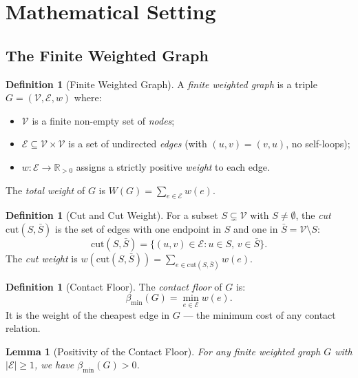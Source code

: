 \documentclass[11pt,twocolumn,a4paper]{article}
\theoremstyle{plain}
\newtheorem{lemma}[theorem]{Lemma}
\theoremstyle{definition}
\newtheorem{definition}[theorem]{Definition}
\theoremstyle{remark}
\newcommand{\cut}{\mathrm{cut}}
\newcommand{\reals}{\mathbb{R}}
\newcommand{\Ecal}{\mathcal{E}}
\newcommand{\Vcal}{\mathcal{V}}
\newcommand{\bmin}{\beta_{\min}}
\begin{document}
\section{Mathematical Setting}
\label{sec:setting}

\subsection{The Finite Weighted Graph}

\begin{definition}[Finite Weighted Graph]
\label{def:fwg}
A \emph{finite weighted graph} is a triple $G = (\Vcal, \Ecal, w)$ where:
\begin{itemize}
  \item $\Vcal$ is a finite non-empty set of \emph{nodes};
  \item $\Ecal \subseteq \Vcal \times \Vcal$ is a set of undirected
  \emph{edges} (with $(u,v) = (v,u)$, no self-loops);
  \item $w: \Ecal \to \reals_{> 0}$ assigns a strictly positive \emph{weight}
  to each edge.
\end{itemize}
The \emph{total weight} of $G$ is $W(G) = \sum_{e \in \Ecal} w(e)$.
\end{definition}

\begin{definition}[Cut and Cut Weight]
\label{def:cut}
For a subset $S \subsetneq \Vcal$ with $S \neq \emptyset$, the \emph{cut}
$\cut(S, \bar{S})$ is the set of edges with one endpoint in $S$ and one in
$\bar{S} = \Vcal \setminus S$:
\[
  \cut(S, \bar{S}) = \{(u,v) \in \Ecal : u \in S,\, v \in \bar{S}\}.
\]
The \emph{cut weight} is $w(\cut(S,\bar{S})) = \sum_{e \in \cut(S,\bar{S})} w(e)$.
\end{definition}

\begin{definition}[Contact Floor]
\label{def:floor}
The \emph{contact floor} of $G$ is:
\[
  \bmin(G) = \min_{e \in \Ecal} w(e).
\]
It is the weight of the cheapest edge in $G$ --- the minimum cost of any
contact relation.
\end{definition}

\begin{lemma}[Positivity of the Contact Floor]
\label{lem:floor_positive}
For any finite weighted graph $G$ with $|\Ecal| \geq 1$, we have $\bmin(G) > 0$.
\end{lemma}
\end{document}
